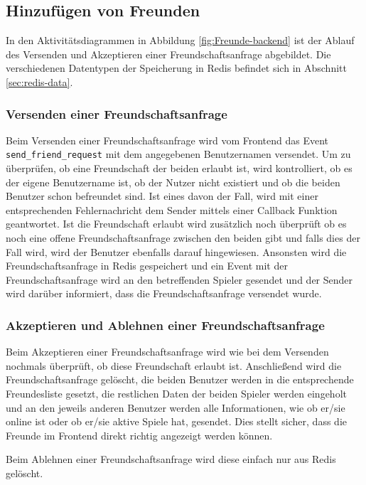 \subsection{Hinzufügen von Freunden}
\label{sec:hinzufügen-von-Freunden}
In den Aktivitätsdiagrammen in Abbildung \ref{fig:Freunde-backend} ist der Ablauf des Versenden und Akzeptieren einer Freundschaftsanfrage abgebildet.
Die verschiedenen Datentypen der Speicherung in Redis befindet sich in Abschnitt \ref{sec:redis-data}.

\subsubsection{Versenden einer Freundschaftsanfrage}
Beim Versenden einer Freundschaftsanfrage wird vom Frontend das Event \verb|send_friend_request| mit dem angegebenen Benutzernamen versendet. Um zu überprüfen, ob eine Freundschaft der beiden erlaubt ist, wird kontrolliert, ob es der eigene Benutzername ist, ob der Nutzer nicht existiert und ob die beiden Benutzer schon befreundet sind. Ist eines davon der Fall, wird mit einer entsprechenden Fehlernachricht dem Sender mittels einer Callback Funktion geantwortet. 
Ist die Freundschaft erlaubt wird zusätzlich noch überprüft ob es noch eine offene Freundschaftsanfrage zwischen den beiden gibt und falls dies der Fall wird, wird der Benutzer ebenfalls darauf hingewiesen.
Ansonsten wird die Freundschaftsanfrage in Redis gespeichert und ein Event mit der Freundschaftsanfrage wird an den betreffenden Spieler gesendet und der Sender wird darüber informiert, dass die Freundschaftsanfrage versendet wurde.

\subsubsection{Akzeptieren und Ablehnen einer Freundschaftsanfrage}
\label{sec:accept-friend-request}
Beim Akzeptieren einer Freundschaftsanfrage wird wie bei dem Versenden nochmals überprüft, ob diese Freundschaft erlaubt ist. Anschließend wird die Freundschaftsanfrage gelöscht, die beiden Benutzer werden in die entsprechende Freundesliste gesetzt, die restlichen Daten der beiden Spieler werden eingeholt und an den jeweils anderen Benutzer werden alle Informationen, wie ob er/sie online ist oder ob er/sie aktive Spiele hat, gesendet. Dies stellt sicher, dass die Freunde im Frontend direkt richtig angezeigt werden können.

Beim Ablehnen einer Freundschaftsanfrage wird diese einfach nur aus Redis gelöscht.


